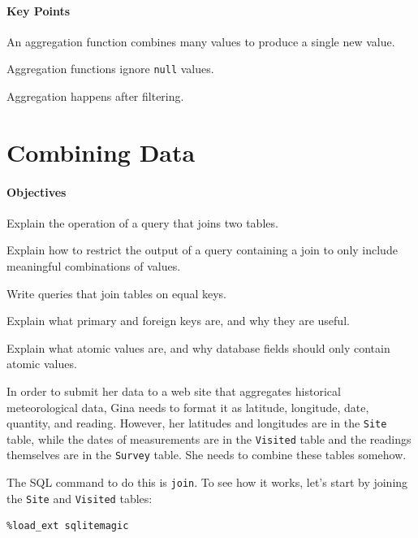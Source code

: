 \documentclass{book}
\begin{document}
\mbox{}\paragraph{Key Points}

\begin{swcitemize}
\item
  An aggregation function combines many values to produce a single new
  value.
\item
  Aggregation functions ignore \texttt{null} values.
\item
  Aggregation happens after filtering.
\end{swcitemize}

\section{Combining Data}

\mbox{}\paragraph{Objectives}

\begin{swcitemize}
\item
  Explain the operation of a query that joins two tables.
\item
  Explain how to restrict the output of a query containing a join to
  only include meaningful combinations of values.
\item
  Write queries that join tables on equal keys.
\item
  Explain what primary and foreign keys are, and why they are useful.
\item
  Explain what atomic values are, and why database fields should only
  contain atomic values.
\end{swcitemize}

In order to submit her data to a web site that aggregates historical
meteorological data, Gina needs to format it as latitude, longitude,
date, quantity, and reading. However, her latitudes and longitudes are
in the \texttt{Site} table, while the dates of measurements are in the
\texttt{Visited} table and the readings themselves are in the
\texttt{Survey} table. She needs to combine these tables somehow.

The SQL command to do this is \texttt{join}. To see how it works, let's
start by joining the \texttt{Site} and \texttt{Visited} tables:

\begin{verbatim}
%load_ext sqlitemagic
\end{verbatim}
\end{document}
